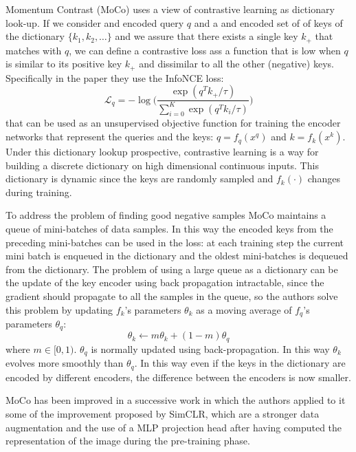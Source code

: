 Momentum Contrast (MoCo) \cite{he2020momentum} uses a view of contrastive learning as dictionary look-up. If we consider and encoded query $q$ and a and encoded set of of keys of the dictionary $\{k_1, k_2, \dots\}$ and we assure that there exists a single key $k_+$ that matches with $q$, we can define a contrastive loss ass a function that is low when $q$ is similar to its positive key $k_+$ and dissimilar to all the other (negative) keys. Specifically in the paper they use the InfoNCE loss: 
\[ \mathcal{L}_q = - \log\Bigg( \frac{\exp(q^Tk_+/\tau)}{\sum_{i=0}^K \exp(q^T k_i/\tau)}\Bigg)\]
that can be used as an unsupervised objective function for training the encoder networks that represent the queries and the keys: $q = f_q(x^q)$ and $k = f_k(x^k)$. Under this dictionary lookup prospective, contrastive learning is a way for building a discrete dictionary on high dimensional continuous inputs. This dictionary is dynamic since the keys are randomly sampled and $f_k(\cdot)$ changes during training. 

To address the problem of finding good negative samples MoCo maintains a queue of mini-batches of data samples. In this way the encoded keys from the preceding mini-batches can be used in the loss: at each training step the current mini batch is enqueued in the dictionary and the oldest mini-batches is dequeued from the dictionary. The problem of using a large queue as a dictionary can be the update of the key encoder using back propagation intractable, since the gradient should propagate to all the samples in the queue, so the authors solve this problem by updating $f_k$'s parameters $\theta_k$ as a moving average of $f_q$'s parameters $\theta_q$:
\[\theta_k \leftarrow m\theta_k + (1-m)\theta_q \]
where $m \in [0,1)$. $\theta_q$ is normally updated using back-propagation. In this way $\theta_k$ evolves more smoothly than $\theta_q$. In this way even if the keys in the dictionary are encoded by different encoders, the difference between the encoders is now smaller.

MoCo has been improved in a successive work \cite{chen2020simple} in which the authors applied to it some of the improvement proposed by SimCLR, which are a stronger data augmentation and the use of a MLP projection head after having computed the representation of the image during the pre-training phase.